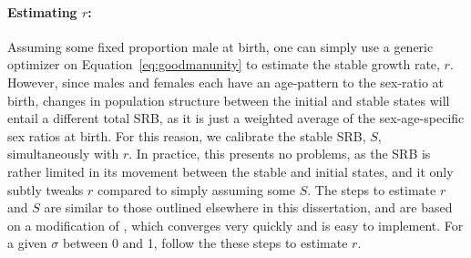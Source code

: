 \paragraph{Estimating $r$: } 
Assuming some fixed proportion male at birth, one can simply use a generic
optimizer on Equation~\eqref{eq:goodmanunity} to estimate the stable growth
rate, $r$. However, since males and females each have an age-pattern to
the sex-ratio at birth, changes in population structure between the initial and
stable states will entail a different total SRB, as it is just a weighted
average of the sex-age-specific sex ratios at birth. For this reason, we 
calibrate the stable SRB, $S$, simultaneously with $r$. In
practice, this presents no problems, as the SRB is rather limited in its
movement between the stable and initial states, and it only subtly tweaks $r$
compared to simply assuming some $S$. The steps to estimate $r$ and $S$ are
similar to those outlined elsewhere in this dissertation, and are based on a
modification of \citet{coale1957new}, which converges very quickly and is easy
to implement. For a given $\sigma$ between 0 and 1, follow the these steps
to estimate $r$.

